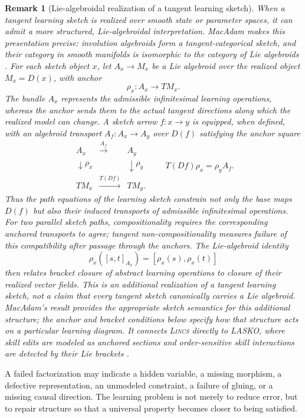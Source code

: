 \documentclass{article}
\newtheorem{remark}{Remark}
\begin{document}
\begin{remark}[Lie-algebroidal realization of a tangent learning sketch]
When a tangent learning sketch is realized over smooth state or parameter
spaces, it can admit a more structured, Lie-algebroidal interpretation.
MacAdam makes this presentation precise: involution algebroids form a
tangent-categorical sketch, and their category in smooth manifolds is
isomorphic to the category of Lie algebroids
\citep{macadam2022functorial}.  For
each sketch object $x$, let $A_x\to M_x$ be a Lie algebroid over the realized
object $M_x=D(x)$, with anchor
\[
\rho_x:A_x\longrightarrow TM_x.
\]
The bundle $A_x$ represents the admissible infinitesimal learning operations,
whereas the anchor sends them to the actual tangent directions along which the
realized model can change.  A sketch arrow $f:x\to y$ is equipped, when
defined, with an algebroid transport $A_f:A_x\to A_y$ over $D(f)$ satisfying
the anchor square
\[
\begin{array}{ccc}
A_x & \xrightarrow{A_f} & A_y\\
\downarrow\rho_x && \downarrow\rho_y\\
TM_x & \xrightarrow{T(Df)} & TM_y.
\end{array}
\qquad
T(Df)\rho_x=\rho_yA_f.
\]
Thus the path equations of the learning sketch constrain not only the base
maps $D(f)$ but also their induced transports of admissible infinitesimal
operations.  For two parallel sketch paths, compositionality requires the
corresponding anchored transports to agree; tangent non-compositionality
measures failure of this compatibility after passage through the anchors.
The Lie-algebroid identity
\[
\rho_x([s,t]_{A_x})=[\rho_x(s),\rho_x(t)]
\]
then relates bracket closure of abstract learning operations to closure of
their realized vector fields.  This is an additional realization of a tangent
learning sketch, not a claim that every tangent sketch canonically carries a
Lie algebroid.  MacAdam's result provides the appropriate sketch semantics for
this additional structure; the anchor and bracket conditions below specify how
that structure acts on a particular learning diagram.  It connects \textsc{Lincs}   directly to LASKO, where skill edits are
modeled as anchored sections and order-sensitive skill interactions are
detected by their Lie brackets
\citep{macadam2022functorial,mahadevan2026lasko}.
\end{remark}

A failed factorization may indicate a hidden variable, a missing morphism, a defective representation, an unmodeled constraint, a failure of gluing, or a missing causal direction. The learning problem is not merely to reduce error, but to repair structure so that a universal property becomes closer to being satisfied.
\end{document}
